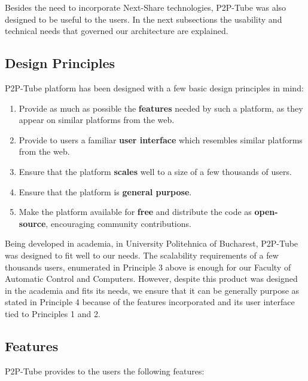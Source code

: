 Besides the need to incorporate Next-Share technologies, P2P-Tube was also designed to be useful to the users. In the next subsections the usability and technical needs that governed our architecture are explained.

\subsection{Design Principles}
\label{subsec:design-principles}

P2P-Tube platform has been designed with a few basic design principles in mind:

\begin{enumerate}
 \item Provide as much as possible the \textbf{features} needed by such a platform, as they appear on similar platforms from the web.
 \item Provide to users a familiar \textbf{user interface} which resembles similar platforms from the web.
 \item Ensure that the platform \textbf{scales} well to a size of a few thousands of users.
 \item Ensure that the platform is \textbf{general purpose}.
 \item Make the platform available for \textbf{free} and distribute the code as \textbf{open-source}, encouraging community contributions.
\end{enumerate}

Being developed in academia, in University Politehnica of Bucharest, P2P-Tube was designed to fit well to our needs. The scalability requirements of a few thousands users, enumerated in Principle 3 above is enough for our Faculty of Automatic Control and Computers. However, despite this product was designed in the academia and fits its needs, we ensure that it can be generally purpose as stated in Principle 4 because of the features incorporated and its user interface tied to Principles 1 and 2.

\subsection{Features}
\label{subsec:features}

P2P-Tube provides to the users the following features:

